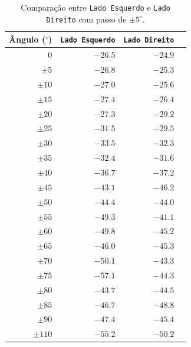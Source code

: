 \begin{apendicesenv}
\begin{table}[htbp]
\centering
\caption{Comparação entre \texttt{Lado Esquerdo} e \texttt{Lado Direito} com passo de $\pm5^\circ$.}
\begin{tabular}{rrrr}
\toprule
\textbf{Ângulo ($^\circ$)} & \textbf{\texttt{Lado Esquerdo}} & \textbf{\texttt{Lado Direito}}\\
\midrule
0  & $-26.5$ & $-24.9$ \\
$\pm5$  & $-26.8$ & $-25.3$ \\
$\pm10$ & $-27.0$ & $-25.6$ \\
$\pm15$ & $-27.4$ & $-26.4$ \\
$\pm20$ & $-27.3$ & $-29.2$ \\
$\pm25$ & $-31.5$ & $-29.5$ \\
$\pm30$ & $-33.5$ & $-32.3$ \\
$\pm35$ & $-32.4$ & $-31.6$ \\
$\pm40$ & $-36.7$ & $-37.2$ \\
$\pm45$ & $-43.1$ & $-46.2$ \\
$\pm50$ & $-44.4$ & $-44.0$ \\
$\pm55$ & $-49.3$ & $-41.1$ \\
$\pm60$ & $-49.8$ & $-45.2$ \\
$\pm65$ & $-46.0$ & $-45.3$ \\
$\pm70$ & $-50.1$ & $-43.3$ \\
$\pm75$ & $-57.1$ & $-44.3$ \\
$\pm80$ & $-43.7$ & $-44.5$ \\
$\pm85$ & $-46.7$ & $-48.8$ \\
$\pm90$ & $-47.4$ & $-45.4$ \\
$\pm110$ & $-55.2$ & $-50.2$ \\
\bottomrule
\end{tabular}
\label{tab:dados_diag_rad}
\end{table}


\end{apendicesenv}
